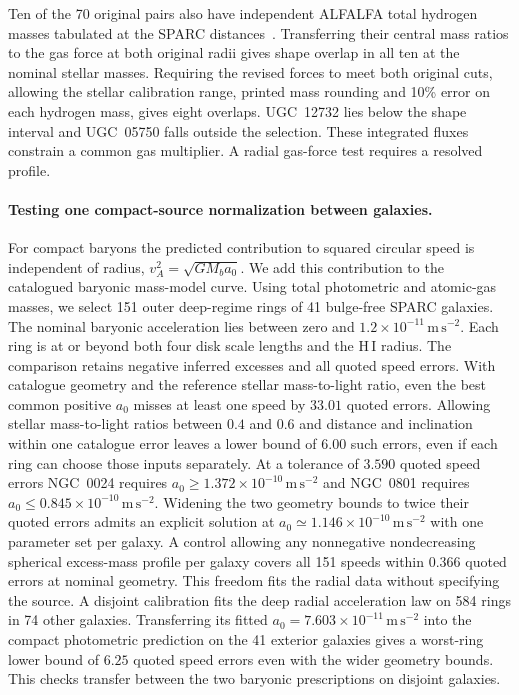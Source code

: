 \documentclass[11pt]{article}
\begin{document}
Ten of the 70 original pairs also have independent ALFALFA total
hydrogen masses tabulated at the SPARC distances~\cite{yasinflux}.
Transferring their central mass ratios to the gas force at both
original radii gives shape overlap in all ten at the nominal stellar
masses. Requiring the revised forces to meet both original cuts,
allowing the stellar calibration range, printed mass rounding and 10\%
error on each hydrogen mass, gives eight overlaps. UGC~12732 lies
below the shape interval and UGC~05750 falls outside the selection.
These integrated fluxes constrain a common gas multiplier. A radial
gas-force test requires a resolved profile.

\paragraph{Testing one compact-source normalization between galaxies.}
For compact baryons the predicted contribution to squared circular speed
is independent of radius, $v_A^2=\sqrt{GM_ba_0}$. We add this contribution
to the catalogued baryonic mass-model curve. Using total photometric and
atomic-gas masses, we select 151 outer deep-regime rings of 41 bulge-free
SPARC galaxies. The nominal baryonic acceleration
lies between zero and $1.2\times10^{-11}\,\mathrm{m\,s^{-2}}$.
Each ring is at or beyond both four disk scale lengths and the H\,I radius. The comparison retains negative inferred excesses
and all quoted speed errors. With catalogue geometry and the reference
stellar mass-to-light ratio, even the best common positive $a_0$ misses
at least one speed by $33.01$ quoted errors. Allowing stellar mass-to-light
ratios between $0.4$ and $0.6$ and distance and inclination within one
catalogue error leaves a lower bound of $6.00$ such errors, even if each
ring can choose those inputs separately. At a tolerance of $3.590$ quoted
speed errors NGC~0024 requires $a_0\ge1.372\times10^{-10}\,\mathrm{m\,s^{-2}}$
and NGC~0801 requires $a_0\le0.845\times10^{-10}\,\mathrm{m\,s^{-2}}$.
Widening the two geometry bounds to twice their quoted errors admits an
explicit solution at $a_0\simeq1.146\times10^{-10}\,\mathrm{m\,s^{-2}}$ with one
parameter set per galaxy. A control allowing any nonnegative nondecreasing spherical excess-mass
profile per galaxy covers all 151 speeds within $0.366$ quoted errors at
nominal geometry. This freedom fits the radial data without specifying
the source. A disjoint calibration fits the deep radial acceleration law
on 584 rings in 74 other galaxies. Transferring its fitted
$a_0=7.603\times10^{-11}\,\mathrm{m\,s^{-2}}$ into the compact
photometric prediction on the 41 exterior galaxies gives a worst-ring
lower bound of $6.25$ quoted speed errors even with the wider geometry
bounds. This checks transfer between the two baryonic prescriptions on
disjoint galaxies.
\end{document}

